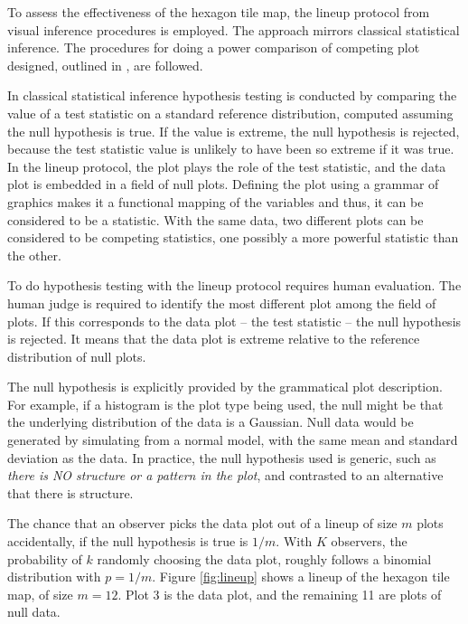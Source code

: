 \documentclass[times, doublespace]{anzsauth}
\begin{document}
To assess the effectiveness of the hexagon tile map, the lineup
protocol \citep{GIIV, BCHLLSW09}
from visual inference procedures is employed. The approach mirrors
classical statistical inference. The procedures for doing a power
comparison of competing plot designed, outlined in
\cite{GTPCCD}, are followed.

In classical statistical inference hypothesis testing is conducted by
comparing the value of a test statistic on a standard reference
distribution, computed assuming the null hypothesis is true. If the
value is extreme, the null hypothesis is rejected, because the test
statistic value is unlikely to have been so extreme if it was true. In
the lineup protocol, the plot plays the role of the test statistic, and
the data plot is embedded in a field of null plots. Defining the plot
using a grammar of graphics \citep{ggplot2} makes it a
functional mapping of the variables and thus, it can be considered to be
a statistic. With the same data, two different plots can be considered
to be competing statistics, one possibly a more powerful statistic than
the other.

To do hypothesis testing with the lineup protocol requires human
evaluation. The human judge is required to identify the most different
plot among the field of plots. If this corresponds to the data plot --
the test statistic -- the null hypothesis is rejected. It means that the
data plot is extreme relative to the reference distribution of null
plots.

The null hypothesis is explicitly provided by the grammatical plot
description. For example, if a histogram is the plot type being used,
the null might be that the underlying distribution of the data is a
Gaussian. Null data would be generated by simulating from a normal
model, with the same mean and standard deviation as the data. In
practice, the null hypothesis used is generic, such as \emph{there is NO
structure or a pattern in the plot}, and contrasted to an alternative
that there is structure.

The chance that an observer picks the data plot out of a lineup of size
\(m\) plots accidentally, if the null hypothesis is true is \(1/m\).
With \(K\) observers, the probability of \(k\) randomly choosing the
data plot, roughly follows a binomial distribution with \(p=1/m\). Figure
\ref{fig:lineup} shows a lineup of the hexagon tile map, of size
\(m=12\). Plot 3 is the data plot, and the remaining 11 are plots of
null data.
\end{document}
